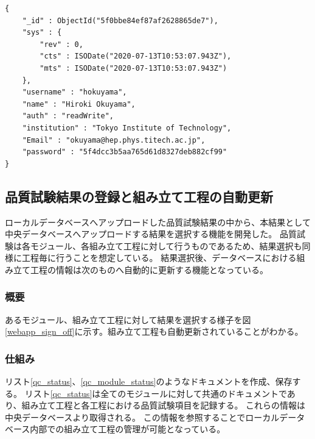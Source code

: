 \begin{lstlisting}[basicstyle=\scriptsize,caption=ウェブアプリケーションで扱うユーザ情報を持つドキュメントの例。リスト\ref{user_doc_1}で示したものとは別に、ウェブアプリケーション内でユーザ情報を扱うためにこのドキュメントを保持する必要がある。ウェブにおいてログインはこのドキュメントの存在確認をもってなされる。パスワードはhash化して保存している。,label=user_doc_2]
{
	"_id" : ObjectId("5f0bbe84ef87af2628865de7"),
	"sys" : {
		"rev" : 0,
		"cts" : ISODate("2020-07-13T10:53:07.943Z"),
		"mts" : ISODate("2020-07-13T10:53:07.943Z")
	},
	"username" : "hokuyama",
	"name" : "Hiroki Okuyama",
	"auth" : "readWrite",
	"institution" : "Tokyo Institute of Technology",
	"Email" : "okuyama@hep.phys.titech.ac.jp",
	"password" : "5f4dcc3b5aa765d61d8327deb882cf99"
}
\end{lstlisting}

\clearpage
\newpage
\subsection{品質試験結果の登録と組み立て工程の自動更新}
ローカルデータベースへアップロードした品質試験結果の中から、本結果として中央データベースへアップロードする結果を選択する機能を開発した。
品質試験は各モジュール、各組み立て工程に対して行うものであるため、結果選択も同様に工程毎に行うことを想定している。
結果選択後、データベースにおける組み立て工程の情報は次のものへ自動的に更新する機能となっている。

\subsubsection{概要}
あるモジュール、組み立て工程に対して結果を選択する様子を図\ref{webapp_sign_off}に示す。組み立て工程も自動更新されていることがわかる。

\subsubsection{仕組み}
リスト\ref{qc_status}、\ref{qc_module_status}のようなドキュメントを作成、保存する。
リスト\ref{qc_status}は全てのモジュールに対して共通のドキュメントであり、組み立て工程と各工程における品質試験項目を記録する。
これらの情報は中央データベースより取得される。
この情報を参照することでローカルデータベース内部での組み立て工程の管理が可能となっている。

